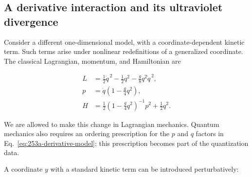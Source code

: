 \subsection{A derivative interaction and its ultraviolet divergence}
\label{sec:253a-derivative-interaction}

Consider a different one-dimensional model, with a coordinate-dependent
kinetic term. Such terms arise under nonlinear redefinitions of a generalized
coordinate. The classical Lagrangian, momentum, and Hamiltonian are

\begin{equation}
 \begin{aligned}
 L&=\frac{1}{2}\dot q^{\,2}-\frac{1}{2}q^2-\frac{g}{8}q^2\dot q^{\,2},\\
 p&=\dot q\left(1-\frac{g}{4}q^2\right),\\
 H&=\frac{1}{2}\left(1-\frac{g}{4}q^2\right)^{-1}p^2+\frac{1}{2}q^2.
 \end{aligned}
 \label{eq:253a-derivative-model}
\end{equation}

We are allowed to make this change in Lagrangian mechanics. Quantum mechanics
also requires an ordering prescription for the $p$ and $q$ factors in
Eq.~\eqref{eq:253a-derivative-model}; this prescription becomes part of the
quantization data.

A coordinate $y$ with a standard kinetic term can be introduced perturbatively:

